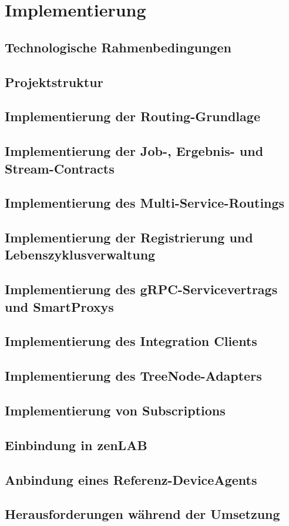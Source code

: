 \chapter{Implementierung}
\section{Technologische Rahmenbedingungen}
\section{Projektstruktur}
\section{Implementierung der Routing-Grundlage}
\section{Implementierung der Job-, Ergebnis- und Stream-Contracts}
\section{Implementierung des Multi-Service-Routings}
\section{Implementierung der Registrierung und Lebenszyklusverwaltung}
\section{Implementierung des gRPC-Servicevertrags und SmartProxys}
\section{Implementierung des Integration Clients}
\section{Implementierung des TreeNode-Adapters}
\section{Implementierung von Subscriptions}
\section{Einbindung in zenLAB}
\section{Anbindung eines Referenz-DeviceAgents}
\section{Herausforderungen während der Umsetzung}
